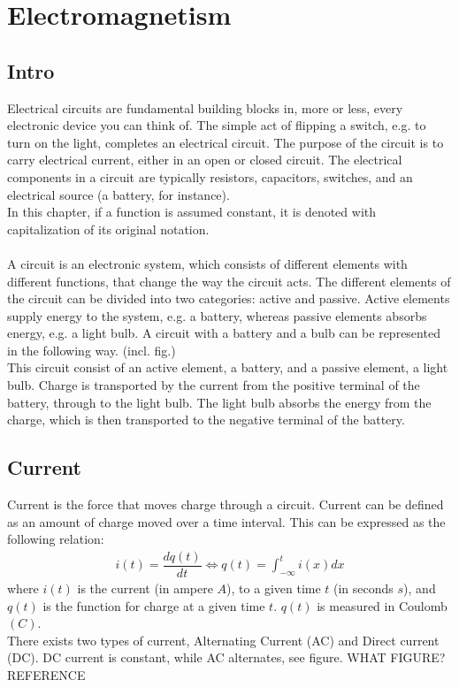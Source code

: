 \chapter{Electromagnetism}
\section{Intro}
Electrical circuits are fundamental building blocks in, more or less, every electronic device you can think of. The simple act of flipping a switch, e.g. to turn on the light, completes an electrical circuit. The purpose of the circuit is to carry electrical current, either in an open or closed circuit. The electrical components in a circuit are typically resistors, capacitors,  switches, and an electrical 	source (a battery, for instance).
\\ 
In this chapter, if a function is assumed constant, it is denoted with capitalization of its original notation. 
\\ 
\\
A circuit is an electronic system, which consists of different elements with different functions, that change the way the circuit acts. The different elements of the circuit can be divided into two categories: active and passive. Active elements supply energy to the system, e.g. a battery, whereas passive elements absorbs energy, e.g. a light bulb. A circuit with a battery and a bulb can be represented in the following way. (incl. fig.)\\ This circuit consist of an active element, a battery, and a passive element, a light bulb. Charge is transported by the current from the positive terminal of the battery, through to the light bulb. The light bulb absorbs the energy from the charge, which is then transported to the negative terminal of the battery.
\\
\section{Current}
Current is the force that moves charge through a circuit. Current can be defined as an amount of charge moved over a time interval. This can be expressed as the following relation:
\begin{align}
i(t)=\dfrac{dq(t)}{dt} \Leftrightarrow q(t)=\int_{-\infty}^{t}i(x)dx
\end{align}
where $i(t)$ is the current (in ampere $A$), to a given time $t$ (in seconds $s$), and $q(t)$ is the function for charge at a given time $t$. $q(t)$ is measured in Coulomb$(C)$.
\\
There exists two types of current, Alternating Current (AC) and Direct current (DC). DC current is constant, while AC alternates, see figure. WHAT FIGURE? REFERENCE
\\
